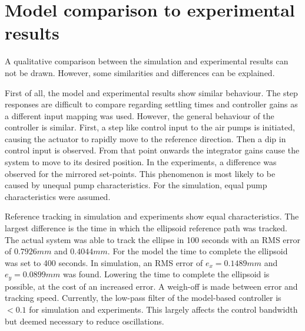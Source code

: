  

\section{Model comparison to experimental results}

A qualitative comparison between the simulation and experimental results can not be drawn. However, some similarities and differences can be explained. 

First of all, the model and experimental results show similar behaviour. The step responses are difficult to compare regarding settling times and controller gains as a different input mapping was used. However, the general behaviour of the controller is similar. First, a step like control input to the air pumps is initiated, causing the actuator to rapidly move to the reference direction. Then a dip in control input is observed. From that point onwards the integrator gains cause the system to move to its desired position. In the experiments, a difference was observed for the mirrored set-points. This phenomenon is most likely to be caused by unequal pump characteristics. For the simulation, equal pump characteristics were assumed. 

Reference tracking in simulation and experiments show equal characteristics. The largest difference is the time in which the ellipsoid reference path was tracked. The actual system was able to track the ellipse in 100 seconds with an RMS error of $0.7926 mm$ and $0.4044 mm$. For the model the time to complete the ellipsoid was set to 400 seconds. In simulation, an RMS error of $e_x = 0.1489 mm$ and $e_y = 0.0899 mm$ was found. Lowering the time to complete the ellipsoid is possible, at the cost of an increased error. A weigh-off is made between error and tracking speed. Currently, the low-pass filter of the model-based controller is $<0.1$ for simulation and experiments. This largely affects the control bandwidth but deemed necessary to reduce oscillations. 
